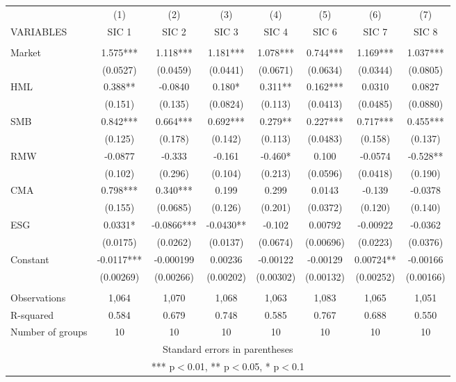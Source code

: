 \begin{tabular}{lccccccc} \hline
 & (1) & (2) & (3) & (4) & (5) & (6) & (7) \\
VARIABLES & SIC 1 & SIC 2 & SIC 3 & SIC 4 & SIC 6 & SIC 7 & SIC 8 \\ \hline
 &  &  &  &  &  &  &  \\
Market & 1.575*** & 1.118*** & 1.181*** & 1.078*** & 0.744*** & 1.169*** & 1.037*** \\
 & (0.0527) & (0.0459) & (0.0441) & (0.0671) & (0.0634) & (0.0344) & (0.0805) \\
HML & 0.388** & -0.0840 & 0.180* & 0.311** & 0.162*** & 0.0310 & 0.0827 \\
 & (0.151) & (0.135) & (0.0824) & (0.113) & (0.0413) & (0.0485) & (0.0880) \\
SMB & 0.842*** & 0.664*** & 0.692*** & 0.279** & 0.227*** & 0.717*** & 0.455*** \\
 & (0.125) & (0.178) & (0.142) & (0.113) & (0.0483) & (0.158) & (0.137) \\
RMW & -0.0877 & -0.333 & -0.161 & -0.460* & 0.100 & -0.0574 & -0.528** \\
 & (0.102) & (0.296) & (0.104) & (0.213) & (0.0596) & (0.0418) & (0.190) \\
CMA & 0.798*** & 0.340*** & 0.199 & 0.299 & 0.0143 & -0.139 & -0.0378 \\
 & (0.155) & (0.0685) & (0.126) & (0.201) & (0.0372) & (0.120) & (0.140) \\
ESG & 0.0331* & -0.0866*** & -0.0430** & -0.102 & 0.00792 & -0.00922 & -0.0362 \\
 & (0.0175) & (0.0262) & (0.0137) & (0.0674) & (0.00696) & (0.0223) & (0.0376) \\
Constant & -0.0117*** & -0.000199 & 0.00236 & -0.00122 & -0.00129 & 0.00724** & -0.00166 \\
 & (0.00269) & (0.00266) & (0.00202) & (0.00302) & (0.00132) & (0.00252) & (0.00166) \\
 &  &  &  &  &  &  &  \\
Observations & 1,064 & 1,070 & 1,068 & 1,063 & 1,083 & 1,065 & 1,051 \\
R-squared & 0.584 & 0.679 & 0.748 & 0.585 & 0.767 & 0.688 & 0.550 \\
 Number of groups & 10 & 10 & 10 & 10 & 10 & 10 & 10 \\ \hline
\multicolumn{8}{c}{ Standard errors in parentheses} \\
\multicolumn{8}{c}{ *** p$<$0.01, ** p$<$0.05, * p$<$0.1} \\
\end{tabular}
